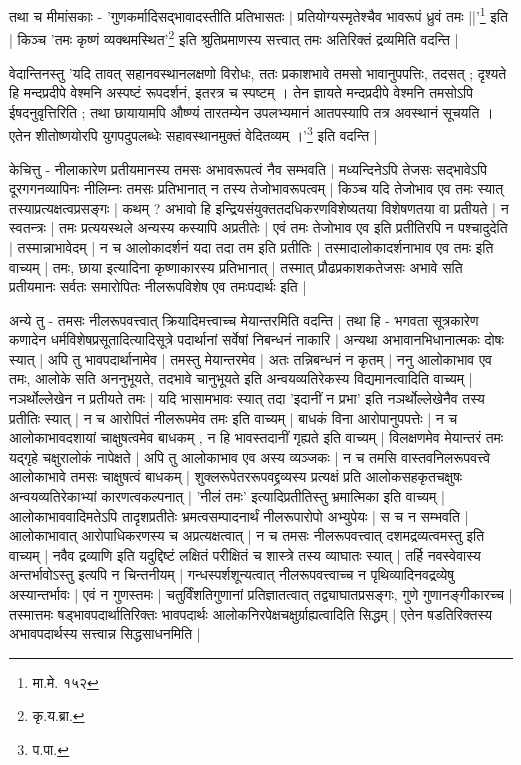 तथा च मीमांसकाः - {\fontsize{11.7}{0}\selectfont\s 'गुणकर्मादिसद्भावादस्तीति प्रतिभासतः | प्रतियोग्यस्मृतेश्चैव भावरूपं ध्रुवं तमः ||'\footnote{मा.मे. १५२}} इति | किञ्च {\fontsize{11.7}{0}\selectfont\s 'तमः कृष्णं व्यक्थमस्थित'\footnote{कृ.य.ब्रा. }} इति श्रुतिप्रमाणस्य सत्त्वात् तमः अतिरिक्तं द्रव्यमिति वदन्ति |

वेदान्तिनस्तु {\fontsize{11.7}{0}\selectfont\s 'यदि तावत् सहानवस्थानलक्षणो विरोधः, ततः प्रकाशभावे तमसो भावानुपपत्तिः, तदसत् ; दृश्यते हि मन्दप्रदीपे वेश्मनि अस्पष्टं रूपदर्शनं, इतरत्र च स्पष्टम् । तेन ज्ञायते मन्दप्रदीपे वेश्मनि तमसोऽपि ईषदनुवृत्तिरिति ; तथा छायायामपि औष्ण्यं तारतम्येन उपलभ्यमानं आतपस्यापि तत्र अवस्थानं सूचयति । एतेन शीतोष्णयोरपि युगपदुपलब्धेः सहावस्थानमुक्तं वेदितव्यम् ।'\footnote{प.पा.}} इति वदन्ति |
  
केचित्तु - नीलाकारेण प्रतीयमानस्य तमसः अभावरूपत्वं नैव सम्भवति | मध्यन्दिनेऽपि तेजसः सद्भावेऽपि दूरगगनव्यापिनः नीलिम्नः तमसः प्रतिभानात् न तस्य तेजोभावरूपत्वम् | किञ्च यदि तेजोभाव एव तमः स्यात् तस्याप्रत्यक्षत्वप्रसङ्गः | कथम् ? अभावो हि इन्द्रियसंयुक्ततदधिकरणविशेष्यतया विशेषणतया वा प्रतीयते | न स्वतन्त्रः | तमः प्रत्ययस्थले अन्यस्य कस्यापि अप्रतीतेः | एवं तमः तेजोभाव एव इति प्रतीतिरपि न पश्चादुदेति | तस्मान्नाभावेदम् | न च आलोकादर्शनं यदा तदा तम इति प्रतीतिः | तस्मादालोकादर्शनाभाव एव तमः इति वाच्यम् | तमः, छाया इत्यादिना कृष्णाकारस्य प्रतिभानात् | तस्मात् प्रौढप्रकाशकतेजसः अभावे सति प्रतीयमानः  सर्वतः समारोपितः  नीलरूपविशेष एव तमःपदार्थः इति |

अन्ये तु - तमसः नीलरूपवत्त्वात् क्रियादिमत्त्वाच्च मेयान्तरमिति वदन्ति | तथा हि - भगवता सूत्रकारेण कणादेन धर्मविशेषप्रसूतादित्यादिसूत्रे पदार्थानां सर्वेषां निबन्धनं नाकारि | अन्यथा अभावानभिधानात्मकः दोषः स्यात् | अपि तु भावपदार्थानामेव | तमस्तु मेयान्तरमेव | अतः तन्निबन्धनं न कृतम् | ननु आलोकाभाव एव तमः, आलोके सति अननुभूयते, तदभावे चानुभूयते इति अन्वयव्यतिरेकस्य विद्यमानत्वादिति वाच्यम् | नञर्थोल्लेखेन न प्रतीयते तमः | यदि भासामभावः‌ स्यात् तदा 'इदानीं न प्रभा' इति नञर्थोल्लेखेनैव तस्य प्रतीतिः स्यात् | न च आरोपितं नीलरूपमेव तमः इति वाच्यम् | बाधकं विना आरोपानुपपत्तेः | न च आलोकाभावदशायां चाक्षुषत्वमेव बाधकम् , न हि भावस्तदानीं गृह्यते  इति वाच्यम् | विलक्षणमेव मेयान्तरं तमः यद्गृहे चक्षुरालोकं नापेक्षते | अपि तु आलोकाभाव एव अस्य व्यञ्जकः | न च तमसि वास्तवनिलरूपवत्त्वे आलोकाभावे तमसः चाक्षुषत्वं बाधकम् | शुक्लरूपेतररूपवद्द्रव्यस्य प्रत्यक्षं प्रति आलोकसहकृतचक्षुषः अन्वयव्यतिरेकाभ्यां कारणत्वकल्पनात् | 'नीलं तमः' इत्यादिप्रतीतिस्तु भ्रमात्मिका इति वाच्यम् | आलोकाभाववादिमतेऽपि तादृशप्रतीतेः भ्रमत्वसम्पादनार्थं नीलरूपारोपो अभ्युपेयः | स च न सम्भवति | आलोकाभावात् आरोपाधिकरणस्य च अप्रत्यक्षत्वात् | न च तमसः नीलरूपवत्त्वात् दशमद्रव्यत्वमस्तु इति वाच्यम् | नवैव द्रव्याणि इति यदुद्दिष्टं लक्षितं परीक्षितं च शास्त्रे तस्य व्याघातः स्यात् | तर्हि नवस्वेवास्य अन्तर्भावोऽस्तु इत्यपि न चिन्तनीयम् | गन्धस्पर्शशून्यत्वात् नीलरूपवत्त्वाच्च न पृथिव्यादिनवद्रव्येषु अस्यान्तर्भावः | एवं न गुणस्तमः | चतुर्विंशतिगुणानां प्रतिज्ञातत्वात् तद्व्याघातप्रसङ्गः, गुणे गुणानङ्गीकारच्च | तस्मात्तमः षड्भावपदार्थातिरिक्तः भावपदार्थः आलोकनिरपेक्षचक्षुर्ग्राह्यत्वादिति सिद्धम् | एतेन षडतिरिक्तस्य अभावपदार्थस्य सत्त्वान्न सिद्धसाधनमिति |

